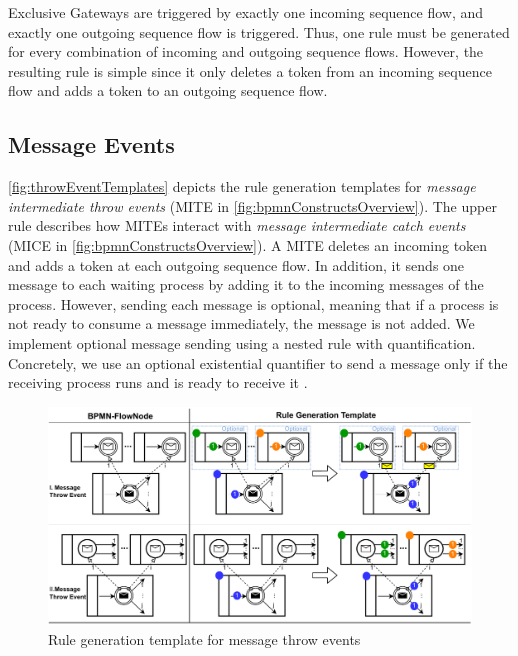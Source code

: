 \documentclass[submission, copyright, creativecommons]{eptcs}
\begin{document}
Exclusive Gateways are triggered by exactly one incoming sequence flow, and exactly one outgoing sequence flow is triggered.
Thus, one rule must be generated for every combination of incoming and outgoing sequence flows.
However, the resulting rule is simple since it only deletes a token from an incoming sequence flow and adds a token to an outgoing sequence flow.

\subsection{Message Events}
\autoref{fig:throwEventTemplates} depicts the rule generation templates for \textit{message intermediate throw events} (\textsf{MITE} in \cref{fig:bpmnConstructsOverview}).
The upper rule describes how MITEs interact with \textit{message intermediate catch events} (\textsf{MICE} in \cref{fig:bpmnConstructsOverview}).
A MITE deletes an incoming token and adds a token at each outgoing sequence flow.
In addition, it sends one message to each waiting process by adding it to the incoming messages of the process.
However, sending each message is optional, meaning that if a process is not ready to consume a message immediately, the message is not added.
We implement optional message sending using a nested rule with quantification.
Concretely, we use an optional existential quantifier to send a message only if the receiving process runs and is ready to receive it \cite{rensinkNestedQuantificationGraph2006}.

\begin{figure}[h]
    \centering
    \includegraphics[width=1\textwidth]{images/throw_messages.pdf}
    \caption{Rule generation template for message throw events}
    \label{fig:throwEventTemplates}
\end{figure}
\end{document}
